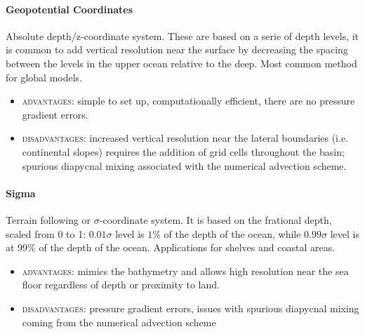 \paragraph{Geopotential Coordinates}
Absolute depth/z-coordinate system. These are based on a serie of depth levels, it is common to add vertical resolution near the surface by decreasing the spacing between the levels in the upper ocean relative to the deep. Most common method for global models.
\begin{itemize}
	\item \textsc{advantages}: simple to set up, computationally efficient, there are no pressure gradient errors.
	\item \textsc{disadvantages}: increased vertical resolution near the lateral boundaries (i.e. continental slopes) requires the addition of grid cells throughout the basin; spurious diapycnal mixing associated with the numerical advection scheme.

\end{itemize}

\paragraph{Sigma} Terrain following or $\sigma$-coordinate system. It is based on the frational depth, scaled from 0 to 1: $0.01\sigma$ level is $1\%$ of the depth of the ocean, while $0.99\sigma$ level is at 99\% of the depth of the ocean. Applications for shelves and coastal areas.
\begin{itemize}
	\item \textsc{advantages}: mimics the bathymetry and allows high resolution near the sea floor regardless of depth or proximity to land.
	\item \textsc{disadvantages}: pressure gradient errors, issues with spurious diapycnal mixing coming from the numerical advection scheme
\end{itemize}

